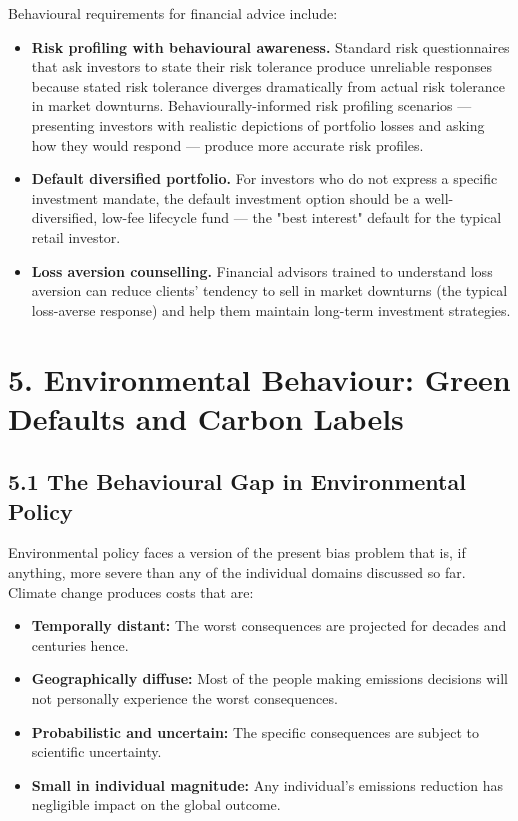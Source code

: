 \documentclass[12pt, letterpaper]{article}
\begin{document}
Behavioural requirements for financial advice include:
\begin{itemize}
\item \textbf{Risk profiling with behavioural awareness.} Standard risk questionnaires that ask investors to state their risk tolerance produce unreliable responses because stated risk tolerance diverges dramatically from actual risk tolerance in market downturns. Behaviourally-informed risk profiling scenarios --- presenting investors with realistic depictions of portfolio losses and asking how they would respond --- produce more accurate risk profiles.
\item \textbf{Default diversified portfolio.} For investors who do not express a specific investment mandate, the default investment option should be a well-diversified, low-fee lifecycle fund --- the "best interest" default for the typical retail investor.
\item \textbf{Loss aversion counselling.} Financial advisors trained to understand loss aversion can reduce clients' tendency to sell in market downturns (the typical loss-averse response) and help them maintain long-term investment strategies.
\end{itemize}

\medskip


\section{5. Environmental Behaviour: Green Defaults and Carbon Labels}



\subsection{5.1 The Behavioural Gap in Environmental Policy}


Environmental policy faces a version of the present bias problem that is, if anything, more severe than any of the individual domains discussed so far. Climate change produces costs that are:
\begin{itemize}
\item \textbf{Temporally distant:} The worst consequences are projected for decades and centuries hence.
\item \textbf{Geographically diffuse:} Most of the people making emissions decisions will not personally experience the worst consequences.
\item \textbf{Probabilistic and uncertain:} The specific consequences are subject to scientific uncertainty.
\item \textbf{Small in individual magnitude:} Any individual's emissions reduction has negligible impact on the global outcome.
\end{itemize}
\end{document}
